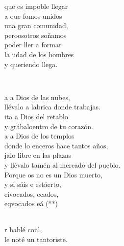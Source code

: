 \documentclass[12pt]{article}
\begin{document}
\begin{multicols*}{2}
\begin{cancion}
\begin{chorus}
            que es impoble llegar\\
            a que fomos unidos \\
        una gran comunidad,\\
            peroosotros soñamos \\
            poder ller a formar\\
            la udad de los hombres \\
            y queriendo llega.\\
            \end{chorus}%
            \jump\\
        \end{cancion}%
        
        \begin{cancion}%
            \begin{chorus}%
            a a Dios de las nubes,\\
            llévalo a labrica donde trabajas. \\
            ita a Dios del retablo\\
            y grábaloentro de tu corazón.\\
            a a Dios de los templos\\
            donde lo enceros hace tantos años,\\
            jalo libre en las plazas \\
            y llévalo tamén al mercado del pueblo.\\
        \jump
            Porque os no es un Dios muerto,\\
            y si sáis e estáerto, \\
            eivocados, ecados,\\
            eqvocados eá (**)\\
            \end{chorus}%
            \jump\\
        \jump
            r hablé conl,\\
            le noté un tantoriste.\\

\end{cancion}
\end{multicols*}
\end{document}

